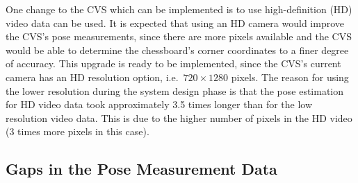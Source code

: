 One change to the CVS which can be implemented is to use high-definition (HD) video data can be used. It is expected that using an HD camera would improve the CVS's pose measurements, since there are more pixels available and the CVS would be able to determine the chessboard's corner coordinates to a finer degree of accuracy. This upgrade is ready to be implemented, since the CVS's current camera has an HD resolution option, i.e.\ $720\times1280$ pixels. The reason for using the lower resolution during the system design phase is that the pose estimation for HD video data took approximately 3.5 times longer than for the low resolution video data. This is due to the higher number of pixels in the HD video (3 times more pixels in this case).






\subsection{Gaps in the Pose Measurement Data}

